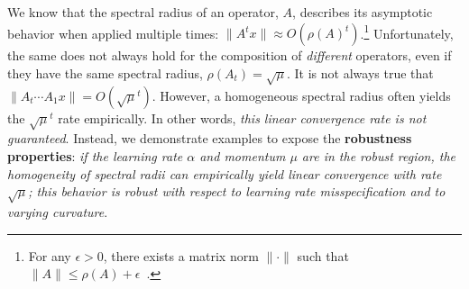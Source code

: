 \documentclass{article}
\newcommand{\mat}[1]{\bm{\mathit{#1}}}
\begin{document}
We know that the spectral radius of an operator, $\mat{A}$, describes its asymptotic behavior when applied multiple times: $\| A^t x \| \approx O(\rho(\mat{A})^t)$.\footnote{
For any $\epsilon > 0$, there exists a matrix norm $\|\cdot\|$ such that $\|\mat{A}\| \leq \rho(A) + \epsilon$~\citep{simon2012spectralradius}.
}
Unfortunately, the same does not always hold for the composition of {\em different } operators, even if they have the same spectral radius, $\rho(\mat{A}_t)=\sqrt{\mu}$.
It is not always true that $\| \mat{A}_t\cdots\mat{A}_1 x\| = O(\sqrt{\mu}^t)$.
However, a homogeneous spectral radius often yields the $\sqrt{\mu}^t$ rate empirically.
In other words, {\em this linear convergence rate is not guaranteed}.
Instead, we demonstrate examples to expose the {\bf robustness properties}: \emph{if the learning rate $\alpha$ and momentum $\mu$ are in the robust region, 
the homogeneity of spectral radii can empirically yield linear convergence with rate $\sqrt{\mu}$; this behavior is robust with respect to learning rate misspecification and to varying curvature}.
\end{document}
